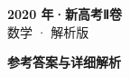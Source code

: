 \documentclass[zihao=-4, a4paper]{ctexart}
\begin{document}
\begin{center}
  {\Large\bfseries 2020 年·新高考Ⅱ卷}\\[4pt]
  {\large 数学 · 解析版}
\end{center}
\medskip
{}

\clearpage
{}
\begin{center}{\Large\bfseries 参考答案与详细解析}\end{center}
\medskip

\end{document}
